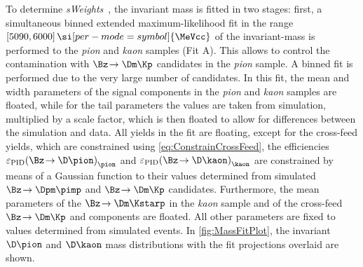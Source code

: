 To determine \emph{sWeights}~\cite{Pivk:2004ty}, the invariant \Bz mass is fitted in two stages:
first, a simultaneous binned extended maximum-likelihood fit in the range $[5090, 6000]\,\si[per-mode=symbol]{\MeVcc}$ of the invariant-mass is performed to the \emph{pion} and \emph{kaon} samples (Fit A).
This allows to control the contamination with $\Bz\!\to\Dm\Kp$ candidates in the \emph{pion} sample.
A binned fit is performed due to the very large number of candidates.
In this fit, the mean and width parameters of the signal components in the \emph{pion} and \emph{kaon} samples are floated, while for the tail parameters the values are taken from simulation, multiplied by a scale factor, which is then floated to allow for differences between the simulation and data.
All yields in the fit are floating, except for the cross-feed yields, which are constrained using \cref{eq:ConstrainCrossFeed}, \ie the efficiencies $\varepsilon_{\text{PID}}\!\left(\Bz\!\to\D \pion\right)_{\pion}$ and $\varepsilon_{\text{PID}}\!\left(\Bz\!\to\D \kaon\right)_{\kaon}$ are constrained by means of a Gaussian function to their values determined from simulated $\Bz\!\to\Dpm\pimp$ and $\Bz\!\to\Dm\Kp$ candidates.
Furthermore, the mean parameters of the $\Bz\!\to\Dm\Kstarp$ in the \emph{kaon} sample and of the cross-feed $\Bz\!\to\Dm\Kp$ and \BdToDpi components are floated.
All other parameters are fixed to values determined from simulated events.
In \cref{fig:MassFitPlot}, the invariant $\D\pion$  and $\D\kaon$ mass distributions with the fit projections overlaid are shown.
